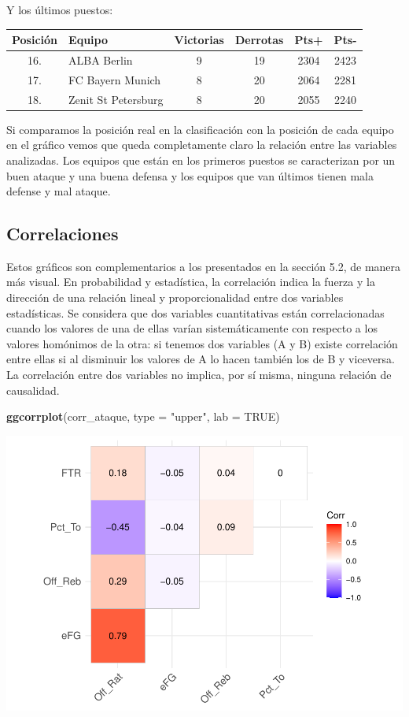 \documentclass[
]{article}
\newenvironment{Shaded}{\begin{snugshade}}{\end{snugshade}}
\newcommand{\DataTypeTok}[1]{\textcolor[rgb]{0.13,0.29,0.53}{#1}}
\newcommand{\KeywordTok}[1]{\textcolor[rgb]{0.13,0.29,0.53}{\textbf{#1}}}
\newcommand{\NormalTok}[1]{#1}
\newcommand{\OtherTok}[1]{\textcolor[rgb]{0.56,0.35,0.01}{#1}}
\newcommand{\StringTok}[1]{\textcolor[rgb]{0.31,0.60,0.02}{#1}}
\begin{document}
Y los últimos puestos:

\begin{longtable}[]{@{}clcccc@{}}
\toprule
\textbf{Posición} & \textbf{Equipo} & \textbf{Victorias} &
\textbf{Derrotas} & \textbf{Pts+} & \textbf{Pts-}\tabularnewline
\midrule
\endhead
16. & ALBA Berlin & 9 & 19 & 2304 & 2423\tabularnewline
17. & FC Bayern Munich & 8 & 20 & 2064 & 2281\tabularnewline
18. & Zenit St Petersburg & 8 & 20 & 2055 & 2240\tabularnewline
\bottomrule
\end{longtable}

Si comparamos la posición real en la clasificación con la posición de
cada equipo en el gráfico vemos que queda completamente claro la
relación entre las variables analizadas. Los equipos que están en los
primeros puestos se caracterizan por un buen ataque y una buena defensa
y los equipos que van últimos tienen mala defense y mal ataque.

\newpage

\hypertarget{correlaciones}{%
\subsection{Correlaciones}\label{correlaciones}}

Estos gráficos son complementarios a los presentados en la sección 5.2,
de manera más visual. En probabilidad y estadística, la correlación
indica la fuerza y la dirección de una relación lineal y
proporcionalidad entre dos variables estadísticas. Se considera que dos
variables cuantitativas están correlacionadas cuando los valores de una
de ellas varían sistemáticamente con respecto a los valores homónimos de
la otra: si tenemos dos variables (A y B) existe correlación entre ellas
si al disminuir los valores de A lo hacen también los de B y viceversa.
La correlación entre dos variables no implica, por sí misma, ninguna
relación de causalidad.

\begin{Shaded}
\begin{Highlighting}[]
\KeywordTok{ggcorrplot}\NormalTok{(corr_ataque, }\DataTypeTok{type =} \StringTok{"upper"}\NormalTok{, }\DataTypeTok{lab =} \OtherTok{TRUE}\NormalTok{)}
\end{Highlighting}
\end{Shaded}

\includegraphics{practica2_files/figure-latex/unnamed-chunk-93-1.pdf}
\end{document}
